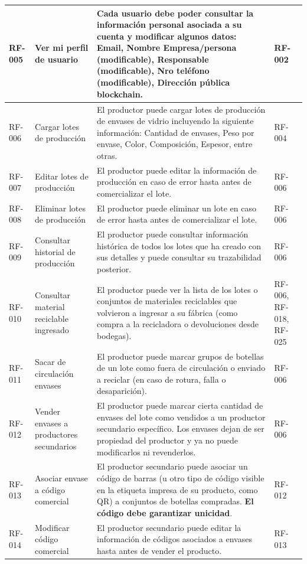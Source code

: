 \begin{xltabular}{\textwidth}{@{} L{1.5cm} L{2.5cm} Y L{1.5cm} @{}}
	\hline
	RF-005 & Ver mi perfil de usuario & Cada usuario debe poder consultar la información personal asociada a su cuenta y modificar algunos datos: Email, Nombre Empresa/persona (modificable), Responsable (modificable), Nro teléfono (modificable), Dirección pública blockchain. & RF-002 \\
	\hline
	RF-006 & Cargar lotes de producción & El productor puede cargar lotes de producción de envases de vidrio incluyendo la siguiente información: Cantidad de envases, Peso por envase, Color, Composición, Espesor, entre otras. & RF-004 \\
	\hline
	RF-007 & Editar lotes de producción & El productor puede editar la información de producción en caso de error hasta antes de comercializar el lote. & RF-006 \\
	\hline
	RF-008 & Eliminar lotes de producción & El productor puede eliminar un lote en caso de error hasta antes de comercializar el lote. & RF-006 \\
	\hline
	RF-009 & Consultar historial de producción & El productor puede consultar información histórica de todos los lotes que ha creado con sus detalles y puede consultar su trazabilidad posterior. & RF-006 \\
	\hline
	RF-010 & Consultar material reciclable ingresado & El productor puede ver la lista de los lotes o conjuntos de materiales reciclables que volvieron a ingresar a su fábrica (como compra a la recicladora o devoluciones desde bodegas). & RF-006, RF-018, RF-025 \\
	\hline
	RF-011 & Sacar de circulación envases & El productor puede marcar grupos de botellas de un lote como fuera de circulación o enviado a reciclar (en caso de rotura, falla o desaparición). & RF-006 \\
	\hline
	RF-012 & Vender envases a productores secundarios & El productor puede marcar cierta cantidad de envases del lote como vendidos a un productor secundario específico. Los envases dejan de ser propiedad del productor y ya no puede modificarlos ni revenderlos. & RF-006 \\
	\hline
	RF-013 & Asociar envase a código comercial & El productor secundario puede asociar un código de barras (u otro tipo de código visible en la etiqueta impresa de su producto, como QR) a conjuntos de botellas compradas. \textbf{El código debe garantizar unicidad}. & RF-012 \\
	\hline
	RF-014 & Modificar código comercial & El productor secundario puede editar la información de códigos asociados a envases hasta antes de vender el producto. & RF-013 \\

\end{xltabular}
